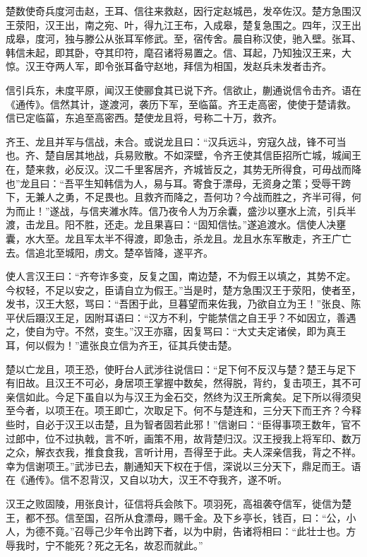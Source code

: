 \documentclass[]{article}
\begin{document}
楚数使奇兵度河击赵，王耳、信往来救赵，因行定赵城邑，发卒佐汉。楚方急围汉王荥阳，汉王出，南之宛、叶，得九江王布，入成皋，楚复急围之。四年，汉王出成皋，度河，独与滕公从张耳军修武。至，宿传舍。晨自称汉使，驰入壁。张耳、韩信未起，即其卧，夺其印符，麾召诸将易置之。信、耳起，乃知独汉王来，大惊。汉王夺两人军，即令张耳备守赵地，拜信为相国，发赵兵未发者击齐。

信引兵东，未度平原，闻汉王使郦食其已说下齐。信欲止，蒯通说信令击齐。语在《通传》。信然其计，遂渡河，袭历下军，至临菑。齐王走高密，使使于楚请救。信已定临菑，东追至高密西。楚使龙且将，号称二十万，救齐。

齐王、龙且并军与信战，未合。或说龙且曰：``汉兵远斗，穷寇久战，锋不可当也。齐、楚自居其地战，兵易败散。不如深壁，令齐王使其信臣招所亡城，城闻王在，楚来救，必反汉。汉二千里客居齐，齐城皆反之，其势无所得食，可毋战而降也''龙且曰：``吾平生知韩信为人，易与耳。寄食于漂母，无资身之策；受辱干跨下，无兼人之勇，不足畏也。且救齐而降之，吾何功？今战而胜之，齐半可得，何为而止！''遂战，与信夹濰水阵。信乃夜令人为万余囊，盛沙以壅水上流，引兵半渡，击龙且。阳不胜，还走。龙且果喜曰：``固知信怯。''遂追渡水。信使人决壅囊，水大至。龙且军太半不得渡，即急击，杀龙且。龙且水东军散走，齐王广亡去。信追北至城阳，虏文。楚卒皆降，遂平齐。

使人言汉王曰：``齐夸诈多变，反复之国，南边楚，不为假王以填之，其势不定。今权轻，不足以安之，臣请自立为假王。''当是时，楚方急围汉王于荥阳，使者至，发书，汉王大怒，骂曰：``吾困于此，旦暮望而来佐我，乃欲自立为王！''张良、陈平伏后蹑汉王足，因附耳语曰：``汉方不利，宁能禁信之自王乎？不如因立，善遇之，使自为守。不然，变生。''汉王亦寤，因复骂曰：``大丈夫定诸侯，即为真王耳，何以假为！''遣张良立信为齐王，征其兵使击楚。

楚以亡龙且，项王恐，使盱台人武涉往说信曰：``足下何不反汉与楚？楚王与足下有旧故。且汉王不可必，身居项王掌握中数矣，然得脱，背约，复击项王，其不可亲信如此。今足下虽自以为与汉王为金石交，然终为汉王所禽矣。足下所以得须臾至今者，以项王在。项王即亡，次取足下。何不与楚连和，三分天下而王齐？今释些时，自必于汉王以击楚，且为智者固若此邪！''信谢曰：``臣得事项王数年，官不过郎中，位不过执戟，言不听，画策不用，故背楚归汉。汉王授我上将军印、数万之众，解衣衣我，推食食我，言听计用，吾得至于此。夫人深亲信我，背之不祥。幸为信谢项王。''武涉已去，蒯通知天下权在于信，深说以三分天下，鼎足而王。语在《通传》。信不忍背汉，又自以功大，汉王不夺我齐，遂不听。

汉王之败固陵，用张良计，征信将兵会陔下。项羽死，高祖袭夺信军，徙信为楚王，都不邳。信至国，召所从食漂母，赐千金。及下乡亭长，钱百，曰：``公，小人，为德不竟。''召辱己少年令出跨下者，以为中尉，告诸将相曰：``此壮士也。方辱我时，宁不能死？死之无名，故忍而就此。''
\end{document}

